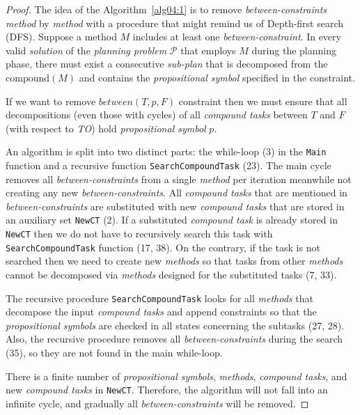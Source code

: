 \begin{proof}
    The idea of the Algorithm~\ref{alg04:1} is to remove \emph{between-constraints} \emph{method} by \emph{method} with a procedure that might remind us of Depth-first search (DFS). Suppose a method \( M \) includes at least one \emph{between-constraint}. In every valid \emph{solution} of the \emph{planning problem} \(\mathcal{P}\) that employs \( M \) during the planning phase, there must exist a consecutive \emph{sub-plan} that is decomposed from the \( \text{compound}(M) \) and contains the \emph{propositional symbol} specified in the constraint.

    If we want to remove $between(T, p, F)$ constraint then we must ensure that all decompositions (even those with cycles) of all \emph{compound tasks} between $T$ and $F$ (with respect to \emph{TO}) hold \emph{propositional symbol} $p$.
    
    An algorithm is split into two distinct parts: the while-loop (3) in the \texttt{Main} function and a recursive function \texttt{SearchCompoundTask} (23). The main cycle removes all \emph{between-constraints} from a single \emph{method} per iteration meanwhile not creating any new \emph{between-constraints}. All \emph{compound tasks} that are mentioned in \emph{between-constraints} are substituted with new \emph{compound tasks} that are stored in an auxiliary set \texttt{NewCT} (2). If a substituted \emph{compound task} is already stored in \texttt{NewCT} then we do not have to recursively search this task with \texttt{SearchCompoundTask} function (17, 38). On the contrary, if the task is not searched then we need to create new \emph{methods} so that tasks from other \emph{methods} cannot be decomposed via \emph{methods} designed for the substituted tasks (7, 33).

    The recursive procedure \texttt{SearchCompoundTask} looks for all \emph{methods} that decompose the input \emph{compound tasks} and append constraints so that the \emph{propositional symbols} are checked in all states concerning the subtasks (27, 28). Also, the recursive procedure removes all \emph{between-constraints} during the search (35), so they are not found in the main while-loop.


    There is a finite number of \emph{propositional symbols}, \emph{methods}, \emph{compound tasks}, and new \emph{compound tasks} in \texttt{NewCT}. Therefore, the algorithm will not fall into an infinite cycle, and gradually all \emph{between-constraints} will be removed.
\end{proof}

